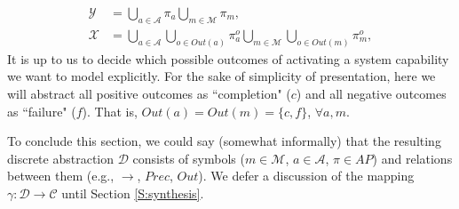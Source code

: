 \begin{subequations}
	\label{ActOutAP}
	\begin{align}
		\mathcal{Y} &= \bigcup \limits_{a \in \mathcal{A}} \pi_a \bigcup \limits_{m \in \mathcal{M}} \pi_m,\\
		\mathcal{X} &= 
		\bigcup \limits_{a \in \mathcal{A}} \bigcup \limits_{o \in Out(a)} \pi_a^o \bigcup \limits_{m \in \mathcal{M}} \bigcup \limits_{o \in Out(m)} \pi_m^o,
	\end{align}
\end{subequations}
It is up to us to decide which possible outcomes of activating a system capability we want to model explicitly.
For the sake of simplicity of presentation, here we will abstract all positive outcomes as ``completion" ($c$) and all negative outcomes as ``failure" ($f$). 
That is, $Out(a) = Out(m) = \{ c, f \}$, $\forall a,m$.

To conclude this section, we could say (somewhat informally) that the resulting discrete abstraction $\mathcal{D}$ consists of symbols ($m \in \mathcal{M}$, $a \in \mathcal{A}$, $\pi \in AP$) and relations between them (e.g., $\boldsymbol\rightarrow$, $Prec$, $Out$).
We defer a discussion of the mapping $\gamma: \mathcal{D} \rightarrow \mathcal{C}$ until Section \ref{S:synthesis}.

%

